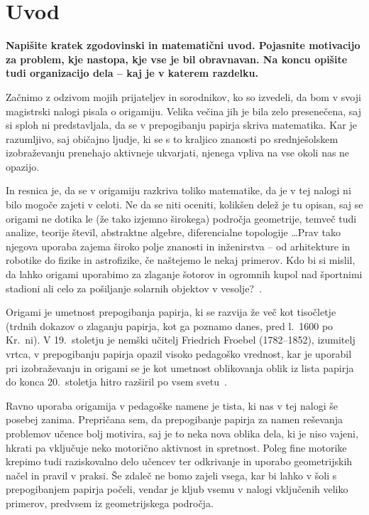 \section{Uvod}

\textbf{Napišite kratek zgodovinski in matematični uvod.  Pojasnite motivacijo za problem, kje nastopa, kje vse je bil obravnavan. Na koncu opišite tudi organizacijo dela -- kaj je v katerem razdelku.}

Začnimo z odzivom mojih prijateljev in sorodnikov, ko so izvedeli, da bom v svoji magistrski nalogi pisala o origamiju. Velika večina jih je bila zelo presenečena, saj si sploh ni predstavljala, da se v prepogibanju papirja skriva matematika. Kar je razumljivo, saj običajno ljudje, ki se s to kraljico znanosti po srednješolskem izobraževanju prenehajo aktivneje ukvarjati, njenega vpliva na vse okoli nas ne opazijo.

In resnica je, da se v origamiju razkriva toliko matematike, da je v tej nalogi ni bilo mogoče zajeti v celoti. Ne da se niti oceniti, kolikšen delež je tu opisan, saj se origami ne dotika le (že tako izjemno širokega) področja geometrije, temveč tudi analize, teorije števil, abstraktne algebre, diferencialne topologije \ldots Prav tako njegova uporaba zajema široko polje znanosti in inženirstva -- od arhitekture in robotike do fizike in astrofizike, če naštejemo le nekaj primerov. Kdo bi si mislil, da lahko origami uporabimo za zlaganje šotorov in ogromnih kupol nad športnimi stadioni ali celo za pošiljanje solarnih objektov v vesolje?~\cite{hull2020}.

Origami je umetnost prepogibanja papirja, ki se razvija že več kot tisočletje (trdnih dokazov o zlaganju papirja, kot ga poznamo danes, pred l.\ 1600 po Kr.\ ni). V 19.\ stoletju je nemški učitelj Friedrich Froebel (1782--1852), izumitelj vrtca, v prepogibanju papirja opazil visoko pedagoško vrednost, kar je uporabil pri izobraževanju in origami se je kot umetnost oblikovanja oblik iz lista papirja do konca 20.\ stoletja hitro razširil po vsem svetu~\cite{robinson2024}.

Ravno uporaba origamija v pedagoške namene je tista, ki nas v tej nalogi še posebej zanima. Prepričana sem, da prepogibanje papirja za namen reševanja problemov učence bolj motivira, saj je to neka nova oblika dela, ki je niso vajeni, hkrati pa vključuje neko motorično aktivnost in spretnost. Poleg fine motorike krepimo tudi raziskovalno delo učencev ter odkrivanje in uporabo geometrijskih načel in pravil v praksi. Še zdaleč ne bomo zajeli vsega, kar bi lahko v šoli s prepogibanjem papirja počeli, vendar je kljub vsemu v nalogi vključenih veliko primerov, predvsem iz geometrijskega področja.


